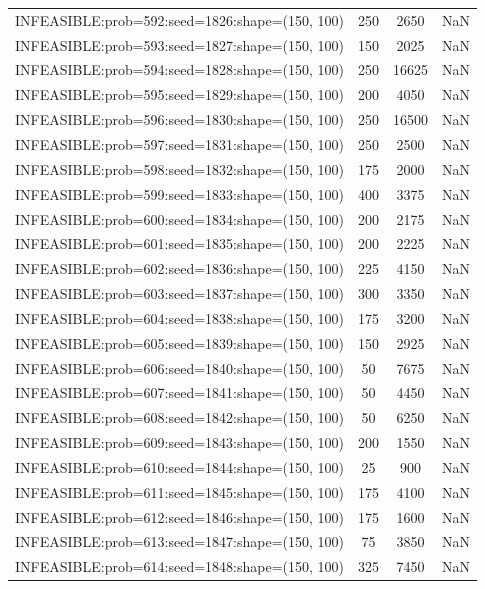 \begin{longtable}{lccc}
INFEASIBLE:prob=592:seed=1826:shape=(150, 100) &      250 &  2650 &    NaN \\
INFEASIBLE:prob=593:seed=1827:shape=(150, 100) &      150 &  2025 &    NaN \\
INFEASIBLE:prob=594:seed=1828:shape=(150, 100) &      250 & 16625 &    NaN \\
INFEASIBLE:prob=595:seed=1829:shape=(150, 100) &      200 &  4050 &    NaN \\
INFEASIBLE:prob=596:seed=1830:shape=(150, 100) &      250 & 16500 &    NaN \\
INFEASIBLE:prob=597:seed=1831:shape=(150, 100) &      250 &  2500 &    NaN \\
INFEASIBLE:prob=598:seed=1832:shape=(150, 100) &      175 &  2000 &    NaN \\
INFEASIBLE:prob=599:seed=1833:shape=(150, 100) &      400 &  3375 &    NaN \\
INFEASIBLE:prob=600:seed=1834:shape=(150, 100) &      200 &  2175 &    NaN \\
INFEASIBLE:prob=601:seed=1835:shape=(150, 100) &      200 &  2225 &    NaN \\
INFEASIBLE:prob=602:seed=1836:shape=(150, 100) &      225 &  4150 &    NaN \\
INFEASIBLE:prob=603:seed=1837:shape=(150, 100) &      300 &  3350 &    NaN \\
INFEASIBLE:prob=604:seed=1838:shape=(150, 100) &      175 &  3200 &    NaN \\
INFEASIBLE:prob=605:seed=1839:shape=(150, 100) &      150 &  2925 &    NaN \\
INFEASIBLE:prob=606:seed=1840:shape=(150, 100) &       50 &  7675 &    NaN \\
INFEASIBLE:prob=607:seed=1841:shape=(150, 100) &       50 &  4450 &    NaN \\
INFEASIBLE:prob=608:seed=1842:shape=(150, 100) &       50 &  6250 &    NaN \\
INFEASIBLE:prob=609:seed=1843:shape=(150, 100) &      200 &  1550 &    NaN \\
INFEASIBLE:prob=610:seed=1844:shape=(150, 100) &       25 &   900 &    NaN \\
INFEASIBLE:prob=611:seed=1845:shape=(150, 100) &      175 &  4100 &    NaN \\
INFEASIBLE:prob=612:seed=1846:shape=(150, 100) &      175 &  1600 &    NaN \\
INFEASIBLE:prob=613:seed=1847:shape=(150, 100) &       75 &  3850 &    NaN \\
INFEASIBLE:prob=614:seed=1848:shape=(150, 100) &      325 &  7450 &    NaN \\

\end{longtable}
